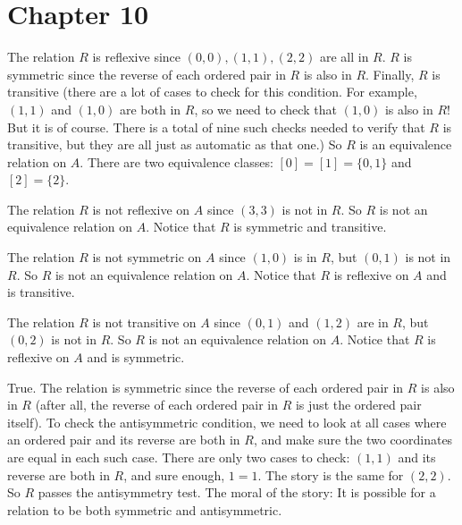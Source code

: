     \section*{Chapter 10}
    
\begin{Solution}{10.1}
The relation $R$ is reflexive since $(0,0),(1,1),(2,2)$ are all in $R$. $R$ is symmetric since the reverse
of each ordered pair in $R$ is also in $R$.  Finally, $R$ is transitive (there are a lot of cases to check
for this condition. For example, $(1,1)$ and $(1,0)$ are both in $R$, so we need to check that $(1,0)$
is also in $R$! But it is of course. There is a total of nine such checks needed to verify that $R$ is transitive,
but they are all just as automatic as that one.) So $R$ is an equivalence relation on $A$. There are two 
equivalence classes: $[0] = [1] = \{0,1\}$ and $[2] = \{2\}$.
\end{Solution}

\begin{Solution}{10.2}
The relation $R$ is not reflexive on $A$ since $(3,3)$ is not in $R$. So $R$ is not an equivalence relation on $A$. Notice
that $R$ is symmetric and transitive.
\end{Solution}  

\begin{Solution}{10.3}
The relation $R$ is not symmetric on $A$ since $(1,0)$ is in $R$, but $(0,1)$ is not in $R$. So $R$ is not an equivalence relation on $A$. 
Notice that $R$ is reflexive on $A$ and is transitive.
\end{Solution}  

\begin{Solution}{10.4}
The relation $R$ is not transitive on $A$ since $(0,1)$  and $(1,2)$ are in $R$, but $(0,2)$ is not in $R$. So $R$ is not an equivalence relation on $A$. 
Notice that $R$ is reflexive on $A$ and is symmetric.
\end{Solution}  

\begin{Solution}{10.5}
True. The relation is symmetric since the reverse of each ordered pair in $R$ is also in $R$ (after all, the reverse of each ordered pair in $R$ is just the ordered pair itself). To check the antisymmetric condition, we need to look at all cases where an ordered pair and its reverse are both in $R$, and make sure the two coordinates are equal in each such case. There are only two cases to check: $(1,1)$ and its reverse are both in $R$, and sure enough, $1=1$. The story is the same for $(2,2)$. So $R$ passes the antisymmetry test. The moral of the story: It is possible for a relation to be both symmetric and antisymmetric.
\end{Solution}

